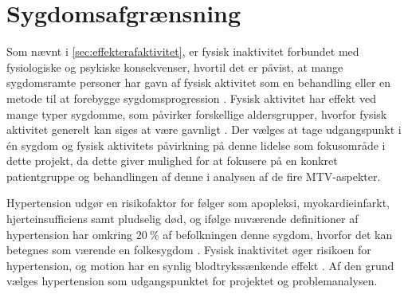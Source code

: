 \section{Sygdomsafgrænsning}
Som nævnt i \autoref{sec:effekterafaktivitet}, er fysisk inaktivitet forbundet med fysiologiske og psykiske konsekvenser, hvortil det er påvist, at mange sygdomsramte personer har gavn af fysisk aktivitet som en behandling eller en metode til at forebygge sygdomsprogression \cite{motionsraad2007,pedersen2011}. Fysisk aktivitet har effekt ved mange typer sygdomme, som påvirker forskellige aldersgrupper, hvorfor fysisk aktivitet generelt kan siges at være gavnligt \cite{pedersen2011}. Der vælges at tage udgangspunkt i én sygdom og fysisk aktivitets påvirkning på denne lidelse som fokusområde i dette projekt, da dette giver mulighed for at fokusere på en konkret patientgruppe og behandlingen af denne i analysen af de fire MTV-aspekter.

Hypertension udgør en risikofaktor for følger som apopleksi, myokardieinfarkt, hjerteinsufficiens samt pludselig død, og ifølge nuværende definitioner af hypertension har omkring $20~\%$ af befolkningen denne sygdom, hvorfor det kan betegnes som værende en folkesygdom \cite{pedersen2011}. Fysisk inaktivitet øger risikoen for hypertension, og motion har en synlig blodtrykssænkende effekt \cite{olsen2015}. Af den grund vælges hypertension som udgangspunktet for projektet og problemanalysen. 
